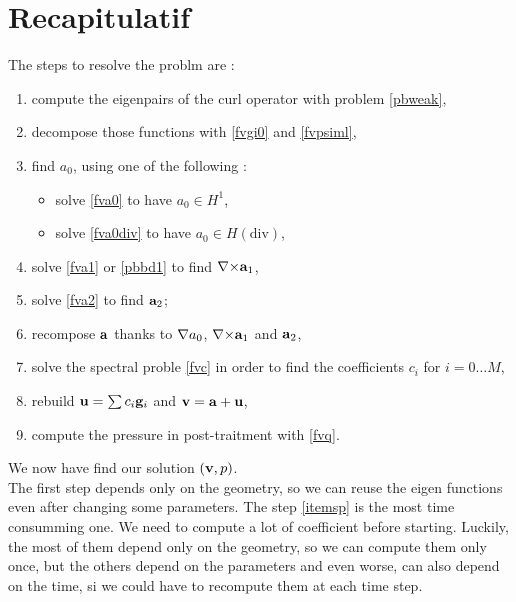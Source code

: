







\chapter{Recapitulatif}

The steps to resolve the problm are :
\begin{enumerate}
\item compute the eigenpairs of the curl operator with problem \ref{pbweak},
\item decompose those functions with \ref{fvgi0} and \ref{fvpsiml},
\item find $a_0$, using one of the following :
  \begin{itemize}
  \item solve \ref{fva0} to have $a_0\in H^1$,
  \item solve \ref{fva0div} to have $a_0\in H(\mathrm{div})$,
  \end{itemize}
\item solve \ref{fva1} or \ref{pbbd1} to find ${\nabla\times}{\mathbf{a}}_1$,
\item solve \ref{fva2} to find ${\mathbf{a}}_2$;
\item recompose ${\mathbf{a}}$ thanks to ${\nabla} a_0$, ${\nabla\times}{\mathbf{a}}_1$ and ${\mathbf{a}}_2$,
\item \label{itemsp} solve the spectral proble \ref{fvc} in order to find the coefficients $c_i$ for $i=0\dots M$,
\item rebuild ${\mathbf{u}}=\sum c_i {\mathbf{g}}_i$ and ${\mathbf{v}}={\mathbf{a}}+{\mathbf{u}}$,
\item compute the pressure in post-traitment with \ref{fvq}.
\end{enumerate}

We now have find our solution $({\mathbf{v}},p)$.\\

The first step depends only on the geometry, so we can reuse the eigen functions even after changing some parameters. The step \ref{itemsp} is the most time consumming one. We need to compute a lot of coefficient before starting. Luckily, the most of them depend only on the geometry, so we can compute them only once, but the others depend on the parameters and even worse, can also depend on the time, si we could have to recompute them at each time step.\\

